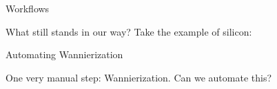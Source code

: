 \documentclass[xcolor=table,aspectratio=169]{beamer}
\numberwithin{equation}{section}
\begin{document}
\begin{frame}{Workflows}

   What still stands in our way? Take the example of silicon:


\end{frame}

\begin{frame}{Automating Wannierization}

   One very manual step: Wannierization. Can we automate this?

   \begin{figure}[t]
      \begin{subfigure}{0.2\textwidth}
\end{subfigure}
\end{figure}
\end{frame}
\end{document}
